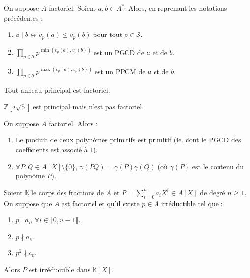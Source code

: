   \begin{proposition}
    On suppose $A$ factoriel. Soient $a, b \in A^*$. Alors, en reprenant les notations précédentes :
    \begin{enumerate}[label={\bfseries(\roman*)}]
      \item $a \mid b \iff v_p(a) \leq v_p(b)$ pour tout $p \in \mathcal{S}$.
      \item $\prod_{p \in \mathcal{S}} p^{\min(v_p(a), v_p(b))}$ est un PGCD de $a$ et de $b$.
      \item $\prod_{p \in \mathcal{S}} p^{\max(v_p(a), v_p(b))}$ est un PPCM de $a$ et de $b$.
    \end{enumerate}
  \end{proposition}

  \begin{theorem}
    \label{142-3}
    Tout anneau principal est factoriel.
  \end{theorem}

  \begin{cexample}
    $\mathbb{Z}[i\sqrt{5}]$ est principal mais n'est pas factoriel.
  \end{cexample}


  \begin{lemma}
    On suppose $A$ factoriel. Alors :
    \begin{enumerate}[label={\bfseries(\roman*)}]
      \item Le produit de deux polynômes primitifs est primitif (ie. dont le PGCD des coefficients est associé à $1$).
      \item $\forall P, Q \in A[X] \setminus \{ 0 \}$, $\gamma(PQ) = \gamma(P) \gamma(Q)$ (où $\gamma(P)$ est le contenu du polynôme $P$).
    \end{enumerate}
  \end{lemma}


  \begin{theorem}
    Soient $\mathbb{K}$ le corps des fractions de $A$ et $P = \sum_{i=0}^n a_i X^i \in A[X]$ de degré $n \geq 1$. On suppose que $A$ est factoriel et qu'il existe $p \in A$ irréductible tel que :
    \begin{enumerate}[label={\bfseries(\roman*)}]
      \item $p \mid a_i$, $\forall i \in \llbracket 0, n-1 \rrbracket$.
      \item $p \nmid a_n$.
      \item $p^2 \nmid a_0$.
    \end{enumerate}
    Alors $P$ est irréductible dans $\mathbb{K}[X]$.
  \end{theorem}

